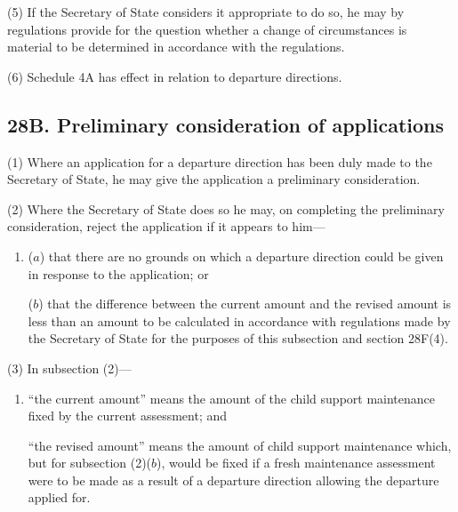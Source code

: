 \documentclass[12pt,a4paper]{article}
\begin{document}
(5) If the Secretary of State considers it appropriate to do so, he may by regulations provide for the question whether a change of circumstances is material to be determined in accordance with the regulations.

(6) Schedule 4A has effect in relation to departure directions.


\subsection{28B. Preliminary consideration of applications}

(1) Where an application for a departure direction has been duly made to the Secretary of State, he may give the application a preliminary consideration.

(2) Where the Secretary of State does so he may, on completing the preliminary consideration, reject the application if it appears to him—
\begin{enumerate}\item[]
($a$) that there are no grounds on which a departure direction could be given in response to the application; or

($b$) that the difference between the current amount and the revised amount is less than an amount to be calculated in accordance with regulations made by the Secretary of State for the purposes of this subsection and section 28F(4).
\end{enumerate}

(3) In subsection (2)—
\begin{enumerate}\item[]
    “the current amount” means the amount of the child support maintenance fixed by the current assessment; and

    “the revised amount” means the amount of child support maintenance which, but for subsection (2)($b$), would be fixed if a fresh maintenance assessment were to be made as a result of a departure direction allowing the departure applied for. 
\end{enumerate}
\end{document}
